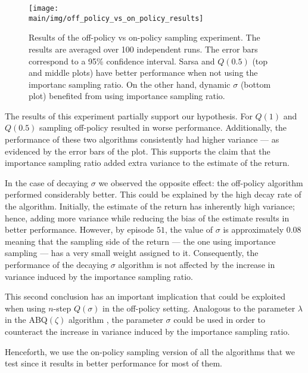 \begin{figure}[htp]
    \setlength{\abovecaptionskip}{5pt plus 0pt minus 0pt}
    \centering
    \texttt{[image: \\main/img/off\_policy\_vs\_on\_policy\_results]}
    \caption[Results of the Off-Policy vs On-Policy Experiment] {Results of the off-policy vs on-policy sampling experiment.
    The results are averaged over 100 independent runs.
    The error bars correspond to a 95\% confidence interval.
    Sarsa and $Q(0.5)$ (top and middle plots) have better performance when not using the importanc sampling ratio.
    On the other hand, dynamic $\sigma$ (bottom plot) benefited from using importance sampling ratio.
    }
    \label{fig:off_policy_vs_on_policy_experiment}
\end{figure}

The results of this experiment partially support our hypothesis.
For $Q(1)$ and $Q(0.5)$ sampling off-policy resulted in worse performance.
Additionally, the performance of these two algorithms consistently had higher variance --- as evidenced by the error bars of the plot.
This supports the claim that the importance sampling ratio added extra variance to the estimate of the return.

In the case of decaying $\sigma$ we observed the opposite effect: the off-policy algorithm performed considerably better.
This could be explained by the high decay rate of the algorithm.
Initially, the estimate of the return has inherently high variance; hence, adding more variance while reducing the bias of the estimate results in better performance.
However, by episode $51$, the value of $\sigma$ is approximately $0.08$ meaning that the sampling side of the return --- the one using importance sampling --- has a very small weight assigned to it.
Consequently, the performance of the decaying $\sigma$ algorithm is not affected by the increase in variance induced by the importance sampling ratio.

This second conclusion has an important implication that could be exploited when using $n$-step $Q(\sigma)$ in the off-policy setting.
Analogous to the parameter $\lambda$ in the ABQ$(\zeta)$ algorithm \parencite{rupam2017}, the parameter $\sigma$ could be used in order to counteract the increase in variance induced by the importance sampling ratio.

Henceforth, we use the on-policy sampling version of all the algorithms that we test since it results in better performance for most of them.

